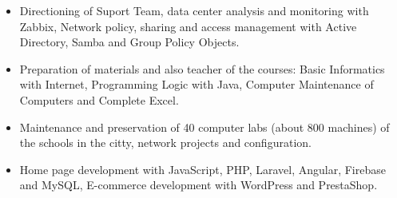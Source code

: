 \documentclass[10pt,a4paper,ragged2e]{altacv}
\begin{document}
\begin{itemize}
  \item Directioning of Suport Team, data center analysis and monitoring with Zabbix, Network policy, sharing and access management with Active Directory, Samba and Group Policy Objects.
\end{itemize}

\vspace{10px}

\begin{itemize} 
  \item Preparation of materials and also teacher of the courses: Basic Informatics with Internet, Programming Logic with Java, Computer Maintenance of Computers and Complete Excel.
\end{itemize}

\vspace{10px}

\begin{itemize}
  \item Maintenance and preservation of 40 computer labs (about 800 machines) of the schools in the citty, network projects and configuration.
\end{itemize}

\vspace{10px}

\begin{itemize}
  \item Home page development with JavaScript, PHP, Laravel, Angular, Firebase and MySQL, E-commerce development with WordPress and PrestaShop.
\end{itemize}

\vspace{10px}

\clearpage
\end{document}
